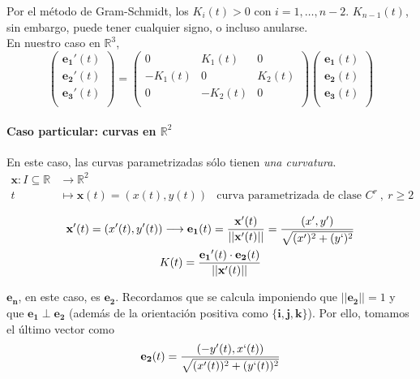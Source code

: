 Por el método de Gram-Schmidt, los $K_i(t)>0$ con $i=1,\ldots,n-2$. $K_{n-1}(t)$, sin embargo, puede tener cualquier signo, o incluso anularse.\\

En nuestro caso en $\mathbb{R}^3$,
$$
\boxed{
\left ( 
\begin{array}{c}
     \mathbf{e_1}'(t)  \\
     \mathbf{e_2}'(t)  \\
     \mathbf{e_3}'(t) \\
\end{array}
\right )=\left ( 
\begin{array}{ccc}
    0 &K_{1}(t) &0  \\
     -K_{1}(t) &0 &K_{2}(t)  \\
     0 &-K_{2}(t) &0   \\
\end{array}
\right ) \left ( 
\begin{array}{c}
     \mathbf{e_1} (t) \\
     \mathbf{e_2} (t)\\
     \mathbf{e_3} (t) \\
\end{array}
\right )
}
$$

\paragraph{Caso particular: curvas en $\mathbb{R}^2$} En este caso, las curvas parametrizadas sólo tienen \emph{una curvatura}. 
\begin{align*}
    \mathbf{x}:I\subseteq \mathbb{R}&\longrightarrow \mathbb{R}^2&\\
                              t &\longmapsto \mathbf{x}(t)=(x(t),y(t)) & \text{curva parametrizada de clase } C^r \ , \ r\ge 2
\end{align*}

\begin{gather*}
    \mathbf{x'}(t)=(x'(t),y'(t))\longrightarrow \mathbf{e_1}(t)=\frac{\mathbf{x'}(t)}{||\mathbf{x'}(t)||}=\frac{(x',y')}{\sqrt{(x')^2+(y`)^2}}\\
    K(t)=\frac{\mathbf{e_1}'(t)\cdot \mathbf{e_2}(t)}{||\mathbf{x'}(t)||}
\end{gather*}

$\mathbf{e_n}$, en este caso, es $\mathbf{e_2}$. Recordamos que se calcula imponiendo que $||\mathbf{e_2}||=1$ y que $\mathbf{e_1}\perp \mathbf{e_2}$ (además de la orientación positiva como $\{ \mathbf{i,j,k} \}$). Por ello, tomamos el último vector como
$$
\mathbf{e_2}(t)=\frac{(-y'(t),x`(t))}{\sqrt{(x'(t))^2+(y`(t))^2}}
$$

